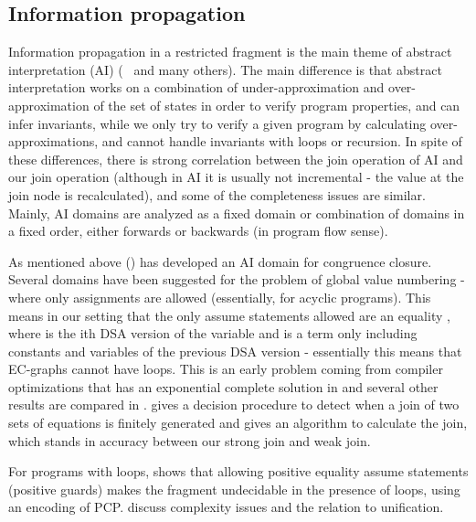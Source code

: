 \subsection{Information propagation}
Information propagation in a restricted fragment is the main theme of abstract interpretation (AI) (~\cite{CousotCousot77} and many others).
The main difference is that abstract interpretation works on a combination of under-approximation and over-approximation of the set of states in order to verify program properties, and can infer invariants, while we only try to verify a given program by calculating over-approximations, and cannot handle invariants with loops or recursion.
In spite of these differences, there is strong correlation between the join operation of AI and our join operation (although in AI it is usually not incremental - the value at the join node is recalculated), and some of the completeness issues are similar. 
Mainly, AI domains are analyzed as a fixed domain or combination of domains in a fixed order, either forwards or backwards (in program flow sense). 

As mentioned above (\cite{ChangLeino2005}) has developed an AI domain for congruence closure.
Several domains have been suggested for the problem of global value numbering - where only assignments are allowed (essentially, for acyclic programs).  This means in our setting that the only assume statements allowed are an equality , 
where  is the ith DSA version of the variable  and  is a term only including constants and variables of the previous DSA version - essentially this means that EC-graphs cannot have loops. This is an early problem coming from compiler optimizations that has an exponential complete solution in \cite{Kildall73} and several other results are compared in \cite{GulwaniTiwariNecula04}.  \cite{Vagvolgyi03b} gives a decision procedure to detect when a join of two sets of equations is finitely generated and gives an algorithm to calculate the join, which stands in accuracy between our strong join and weak join.

For programs with loops, \cite{MullerOlmSeidl04} shows that allowing positive equality assume statements (positive guards) makes the fragment undecidable in the presence of loops, using an encoding of PCP. \cite{GulwaniTiwari07} discuss complexity issues and the relation to unification.

